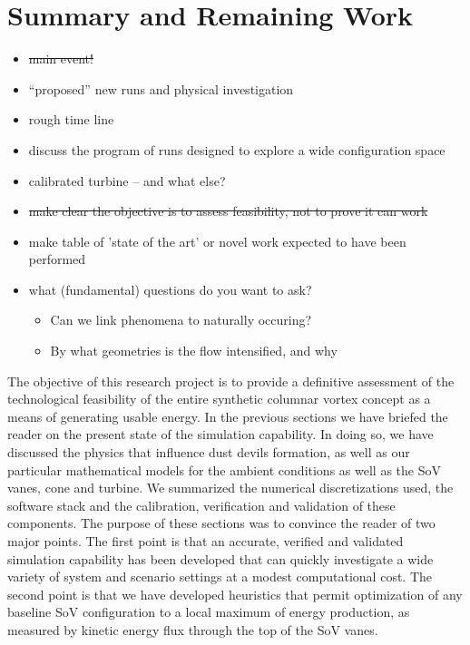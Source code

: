\section{Summary and Remaining Work}
\label{sec:future_work}

\begin{itemize}
\item \st{main event!}
\item ``proposed'' new runs and physical investigation
\item rough time line
\item discuss the program of runs designed to explore a wide configuration space
\item calibrated turbine -- and what else?
\item \st{make clear the objective is to assess feasibility, not to prove it can work}
\item make table of 'state of the art' or novel work expected to have been performed
\item what (fundamental) questions do you want to ask?
      \begin{itemize}
      \item Can we link phenomena to naturally occuring?
      \item By what geometries is the flow intensified, and why
      \end{itemize}
\end{itemize}

The objective of this research project is to provide a definitive
assessment of the  
technological feasibility of the entire synthetic columnar vortex
concept as a means of generating usable energy. In the 
previous sections we have briefed the reader on the present state of the
simulation capability. In doing so, we have discussed the physics that
influence dust devils formation, as well as our particular mathematical
models for the ambient conditions as well as the SoV vanes, cone and
turbine. We summarized the numerical discretizations used, the software
stack and the calibration, verification and validation of these
components. The purpose of these sections was to convince the reader of
two major points. The first point is that an accurate, verified and
validated simulation capability has been developed that can quickly
investigate a wide variety of system and scenario settings at a modest
computational cost. The second point is that we have developed
heuristics that permit optimization of any baseline SoV configuration to
a local maximum of energy production, as measured by kinetic energy flux
through the top of the SoV vanes.  


